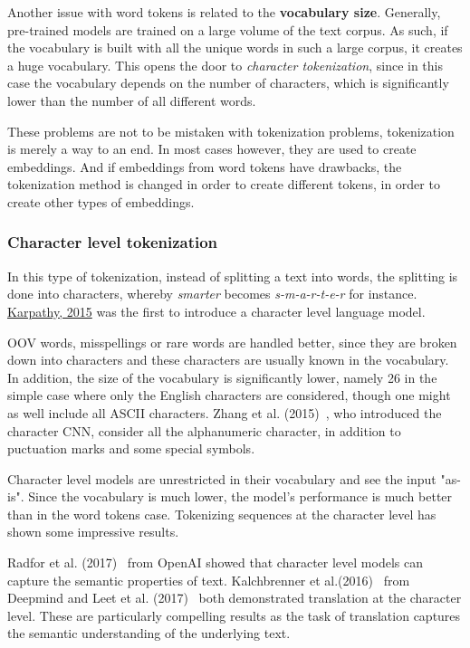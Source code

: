 Another issue with word tokens is related to the \textbf{vocabulary size}. Generally, pre-trained models are trained on a large volume of the text corpus. As such, if the vocabulary is built with all the unique words in such a large corpus, it creates a huge vocabulary. This opens the door to \emph{character tokenization}, since in this case the vocabulary depends on the number of characters, which is significantly lower than the number of all different words.

These problems are not to be mistaken with tokenization problems, tokenization is merely a way to an end. In most cases however, they are used to create embeddings. And if embeddings from word tokens have drawbacks, the tokenization method is changed in order to create different tokens, in order to create other types of embeddings.
    
\subsubsection{Character level tokenization}

In this type of tokenization, instead of splitting a text into words, the splitting is done into characters, whereby \emph{smarter} becomes \emph{s-m-a-r-t-e-r} for instance. \href{https://github.com/karpathy/char-rnn}{Karpathy, 2015} was the first to introduce a character level language model.

OOV words, misspellings or rare words are handled better, since they are broken down into characters and these characters are usually known in the vocabulary. In addition, the size of the vocabulary is significantly lower, namely 26 in the simple case where only the English characters are considered, though one might as well include all ASCII characters. Zhang et al. (2015)~\cite{zhang2015text}, who introduced the character CNN, consider all the alphanumeric character, in addition to puctuation marks and some special symbols.

Character level models are unrestricted in their vocabulary and see the input "as-is". Since the vocabulary is much lower, the model's performance is much better than in the word tokens case. Tokenizing sequences at the character level has shown some impressive results.

Radfor et al. (2017)~\cite{radford2017learning} from OpenAI showed that character level models can capture the semantic properties of text. Kalchbrenner et al.(2016)~\cite{kalchbrenner2016neural} from Deepmind and Leet et al. (2017)~\cite{lee-etal-2017-fully} both demonstrated translation at the character level. These are particularly compelling results as the task of translation captures the semantic understanding of the underlying text.

